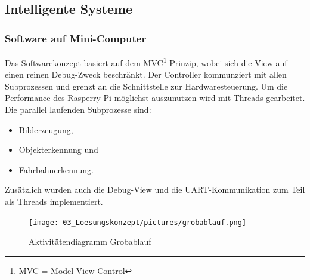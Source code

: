 \subsection{Intelligente Systeme}

\subsubsection{Software auf Mini-Computer}
Das Softwarekonzept basiert auf dem MVC\footnote{MVC = Model-View-Control}-Prinzip, wobei sich die View auf einen reinen Debug-Zweck beschränkt. Der Controller kommunziert mit allen Subprozessen und grenzt an die Schnittstelle zur Hardwaresteuerung. Um die Performance des Rasperry Pi möglichst auszunutzen wird mit Threads gearbeitet. Die parallel laufenden Subprozesse sind:

\begin{itemize}
\item Bilderzeugung,
\item Objekterkennung und
\item Fahrbahnerkennung.
\end{itemize}
Zusätzlich wurden auch die Debug-View und die UART-Kommunikation zum Teil als Threads implementiert.
\begin{figure}[H]
	\centering
	\texttt{[image: 03\_Loesungskonzept/pictures/grobablauf.png]}
	\caption{Aktivitätendiagramm Grobablauf}
\end{figure}


